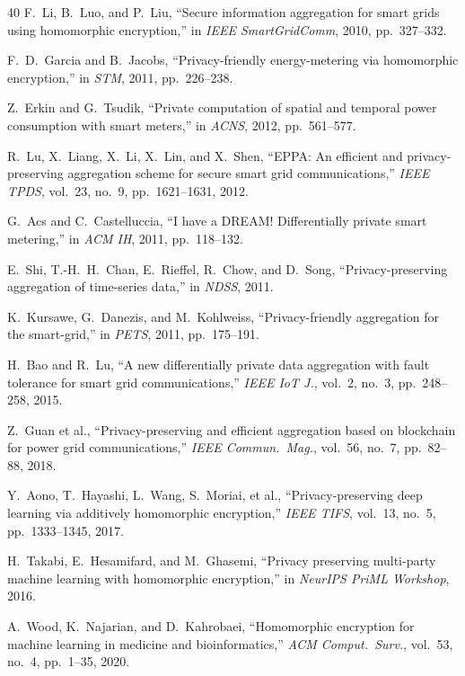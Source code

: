 \begin{thebibliography}{40}
F.~Li, B.~Luo, and P.~Liu, ``Secure information aggregation for smart grids using homomorphic encryption,'' in \emph{IEEE SmartGridComm}, 2010, pp.~327--332.

F.~D.~Garcia and B.~Jacobs, ``Privacy-friendly energy-metering via homomorphic encryption,'' in \emph{STM}, 2011, pp.~226--238.

Z.~Erkin and G.~Tsudik, ``Private computation of spatial and temporal power consumption with smart meters,'' in \emph{ACNS}, 2012, pp.~561--577.

R.~Lu, X.~Liang, X.~Li, X.~Lin, and X.~Shen, ``EPPA: An efficient and privacy-preserving aggregation scheme for secure smart grid communications,'' \emph{IEEE TPDS}, vol.~23, no.~9, pp.~1621--1631, 2012.

G.~Acs and C.~Castelluccia, ``I have a DREAM! Differentially private smart metering,'' in \emph{ACM IH}, 2011, pp.~118--132.

E.~Shi, T.-H.~H.~Chan, E.~Rieffel, R.~Chow, and D.~Song, ``Privacy-preserving aggregation of time-series data,'' in \emph{NDSS}, 2011.

K.~Kursawe, G.~Danezis, and M.~Kohlweiss, ``Privacy-friendly aggregation for the smart-grid,'' in \emph{PETS}, 2011, pp.~175--191.

H.~Bao and R.~Lu, ``A new differentially private data aggregation with fault tolerance for smart grid communications,'' \emph{IEEE IoT J.}, vol.~2, no.~3, pp.~248--258, 2015.

Z.~Guan et al., ``Privacy-preserving and efficient aggregation based on blockchain for power grid communications,'' \emph{IEEE Commun.\ Mag.}, vol.~56, no.~7, pp.~82--88, 2018.

Y.~Aono, T.~Hayashi, L.~Wang, S.~Moriai, et al., ``Privacy-preserving deep learning via additively homomorphic encryption,'' \emph{IEEE TIFS}, vol.~13, no.~5, pp.~1333--1345, 2017.

H.~Takabi, E.~Hesamifard, and M.~Ghasemi, ``Privacy preserving multi-party machine learning with homomorphic encryption,'' in \emph{NeurIPS PriML Workshop}, 2016.

A.~Wood, K.~Najarian, and D.~Kahrobaei, ``Homomorphic encryption for machine learning in medicine and bioinformatics,'' \emph{ACM Comput.\ Surv.}, vol.~53, no.~4, pp.~1--35, 2020.


\end{thebibliography}
